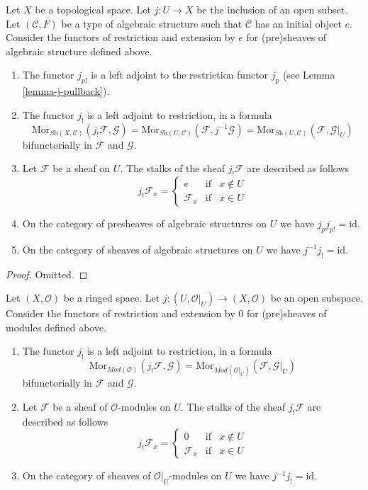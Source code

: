 \begin{lemma}
\label{lemma-j-shriek-structures}
Let $X$ be a topological space.
Let $j : U \to X$ be the inclusion of an open subset.
Let $(\mathcal{C}, F)$ be a type of algebraic structure
such that $\mathcal{C}$ has an initial object $e$.
Consider the functors of restriction and extension
by $e$ for (pre)sheaves of algebraic structure defined above.
\begin{enumerate}
\item The functor $j_{p!}$ is a left adjoint to the
restriction functor $j_p$ (see Lemma \ref{lemma-j-pullback}).
\item The functor $j_!$ is a left adjoint to restriction,
in a formula
$$
\text{Mor}_{\textit{Sh}(X, \mathcal{C})}(j_!\mathcal{F}, \mathcal{G})
=
\text{Mor}_{\textit{Sh}(U, \mathcal{C})}(\mathcal{F}, j^{-1}\mathcal{G})
=
\text{Mor}_{\textit{Sh}(U, \mathcal{C})}(\mathcal{F}, \mathcal{G}|_U)
$$
bifunctorially in $\mathcal{F}$ and $\mathcal{G}$.
\item Let $\mathcal{F}$ be a sheaf on $U$.
The stalks of the sheaf $j_!\mathcal{F}$ are described
as follows
$$
j_{!}\mathcal{F}_x =
\left\{
\begin{matrix}
e & \text{if} & x \not \in U \\
\mathcal{F}_x & \text{if} & x \in U 
\end{matrix}
\right.
$$
\item On the category of presheaves of algebraic structures on $U$
we have $j_pj_{p!} = \text{id}$.
\item On the category of sheaves of algebraic structures on $U$
we have $j^{-1}j_! = \text{id}$.
\end{enumerate}
\end{lemma}

\begin{proof}
Omitted.
\end{proof}

\begin{lemma}
\label{lemma-j-shriek-modules}
Let $(X, \mathcal{O})$ be a ringed space.
Let $j : (U, \mathcal{O}|_U) \to (X, \mathcal{O})$
be an open subspace.
Consider the functors of restriction and extension
by $0$ for (pre)sheaves of modules defined above.
\begin{enumerate}
\item The functor $j_!$ is a left adjoint to restriction,
in a formula
$$
\text{Mor}_{\textit{Mod}(\mathcal{O})}(j_!\mathcal{F}, \mathcal{G})
=
\text{Mor}_{\textit{Mod}(\mathcal{O}|_U)}(\mathcal{F}, \mathcal{G}|_U)
$$
bifunctorially in $\mathcal{F}$ and $\mathcal{G}$.
\item Let $\mathcal{F}$ be a sheaf of $\mathcal{O}$-modules on $U$.
The stalks of the sheaf $j_!\mathcal{F}$ are described
as follows
$$
j_{!}\mathcal{F}_x =
\left\{
\begin{matrix}
0 & \text{if} & x \not \in U \\
\mathcal{F}_x & \text{if} & x \in U 
\end{matrix}
\right.
$$
\item On the category of sheaves of $\mathcal{O}|_U$-modules on $U$
we have $j^{-1}j_! = \text{id}$.
\end{enumerate}
\end{lemma}

